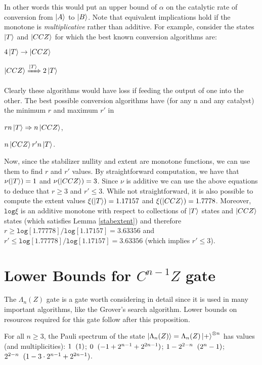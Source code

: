 \documentclass[12pt]{dalthesis}
\begin{document}
In other words this would put an upper bound of $\alpha$ on the catalytic rate of conversion from $\ket{A}$ to $\ket{B}$. Note that equivalent implications hold if the monotone is \textit{multiplicative} rather than additive.
For example, consider the states $\ket{T}$ and $\ket{CCZ}$ for which the best known conversion algorithms are:
\begin{center}
$4\ket{T} \rightarrow \ket{CCZ}$
\end{center}
\begin{center}
$\ket{CCZ} \xRightarrow{\ket{T}} 2\ket{T}$
\end{center}
Clearly these algorithms would have loss if feeding the output of one into the other. The best possible conversion algorithms have (for any n and any catalyst) the minimum $r$ and maximum $r'$ in 
\begin{center}
$rn\ket{T} \Rightarrow n\ket{CCZ}$,
\end{center}
\begin{center}
$n\ket{CCZ} r'n\ket{T}$.
\end{center}

Now, since the stabilizer nullity and extent are monotone functions, we can use them to find $r$ and $r'$ values. By straightforward computation, we have that $\nu (\ket{T}) = 1$ and $\nu(\ket{CCZ}) = 3$. Since $\nu$ is additive we can use the above equations to deduce that $r \geq 3$ and $r' \leq 3$. While not straightforward, it is also possible to compute the extent values $\xi (\ket{T}) = 1.17157$ and $\xi (\ket{CCZ}) = 1.7778$. Moreover, $\texttt{log} \xi$ is an additive monotone with respect to collections of $\ket{T}$ states and $\ket{CCZ}$ states (which satisfies Lemma \ref{stabextent}) and therefore $r \geq \texttt{log}[1.77778]/\texttt{log}[1.17157] = 3.63356$ and $r' \leq \texttt{log}[1.77778]/\texttt{log}[1.17157] = 3.63356$ (which implies $r' \leq 3$).


\section{Lower Bounds for $C^{n-1}Z$ gate}
The $\Lambda_n (Z)$ gate is a gate worth considering in detail since it is used in many important algorithms, like the Grover's search algorithm. Lower bounds on resources required for this gate follow after this proposition.

\begin{proposition}
\label{prop4.2}
For all $n \geq 3$, the Pauli spectrum of the state $\ket{\Lambda_n (Z)} = \Lambda_n (Z) \ket{+}^{\otimes n}$ has values (and multiplicities): $1 \hspace{2mm} (1)$; $0 \hspace{2mm} (-1 +2^{n-1} + 2^{2n-1})$; $1-2^{2-n} \hspace{2mm} (2^n-1)$; $2^{2-n}  \hspace{2mm} (1-3 \cdot 2^{n-1} + 2^{2n-1})$.
\end{proposition}
\end{document}
